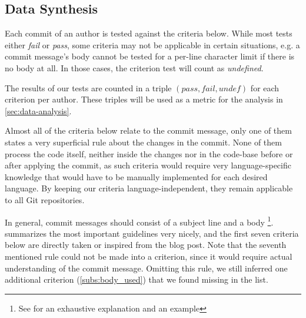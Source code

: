 \subsection{Data Synthesis}
\label{sec:data-synthesis}

%
%
%
%
%
%


Each commit of an author is tested against the criteria below. While most tests either \emph{fail} or \emph{pass}, some criteria may not be applicable in certain situations, e.g. a commit message's body cannot be tested for a per-line character limit if there is no body at all. In those cases, the criterion test will count as \emph{undefined}.

The results of our tests are counted in a triple $(pass, fail, undef)$ for each criterion per author. These triples will be used as a metric for the analysis in \ref{sec:data-analysis}.

Almost all of the criteria below relate to the commit message, only one of them states a very superficial rule about the changes in the commit. None of them process the code itself, neither inside the changes nor in the code-base before or after applying the commit, as such criteria would require very language-specific knowledge that would have to be manually implemented for each desired language. By keeping our criteria language-independent, they remain applicable to all Git repositories.

In general, commit messages should consist of a subject line and a body \footnote{See \cite{OffGuide} for an exhaustive explanation and an example}. \cite{CB} summarizes the most important guidelines very nicely, and the first seven criteria below are directly taken or inspired from the blog post. Note that the seventh mentioned rule could not be made into a criterion, since it would require actual understanding of the commit message. Omitting this rule, we still inferred one additional criterion (\ref{subs:body_used}) that we found missing in the list.

